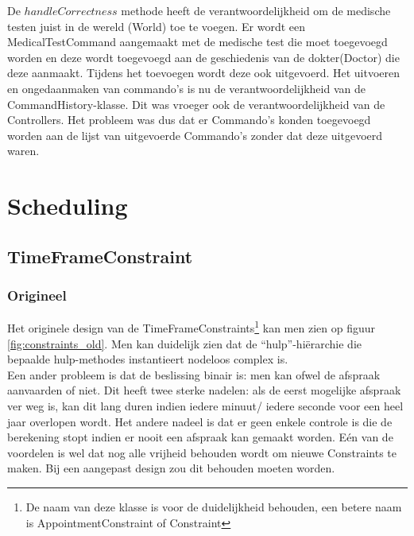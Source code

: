 De $handleCorrectness$ methode heeft de verantwoordelijkheid om de medische testen juist in de wereld (World) toe te voegen. 
Er wordt een MedicalTestCommand aangemaakt met de medische test die moet toegevoegd worden en deze wordt toegevoegd aan de geschiedenis van de dokter(Doctor) die deze aanmaakt. 
Tijdens het toevoegen wordt deze ook uitgevoerd. 
Het uitvoeren en ongedaanmaken van commando's is nu de verantwoordelijkheid van de CommandHistory-klasse.
Dit was vroeger ook de verantwoordelijkheid van de Controllers. 
Het probleem was dus dat er Commando's konden toegevoegd worden aan de lijst van uitgevoerde Commando's zonder dat deze uitgevoerd waren.


\section{Scheduling\label{scheduling}}
\subsection{TimeFrameConstraint}
\subsubsection{Origineel}
Het originele design van de TimeFrameConstraints\footnote{De naam van deze klasse is voor de duidelijkheid behouden, een betere naam is AppointmentConstraint of Constraint} kan men zien op figuur \ref{fig:constraints_old}. 
Men kan duidelijk zien dat de ``hulp''-hiërarchie die bepaalde hulp-methodes instantieert nodeloos complex is.\\

Een ander probleem is dat de beslissing binair is: men kan ofwel de afspraak aanvaarden of niet.
Dit heeft twee sterke nadelen: als de eerst mogelijke afspraak ver weg is, kan dit lang duren indien iedere minuut/ iedere seconde voor een heel jaar overlopen wordt. 
Het andere nadeel is dat er geen enkele controle is die de berekening stopt indien er nooit een afspraak kan gemaakt worden. 
Eén van de voordelen is wel dat nog alle vrijheid behouden wordt om nieuwe Constraints te maken. 
Bij een aangepast design zou dit behouden moeten worden.

